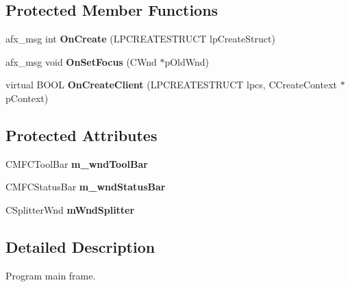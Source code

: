 \subsection*{Protected Member Functions}
\begin{DoxyCompactItemize}
\item 
\hypertarget{class_c_main_frame_a48666466fd37412fcaeff75c3b12e0ed}{afx\+\_\+msg int {\bfseries On\+Create} (L\+P\+C\+R\+E\+A\+T\+E\+S\+T\+R\+U\+C\+T lp\+Create\+Struct)}\label{class_c_main_frame_a48666466fd37412fcaeff75c3b12e0ed}

\item 
\hypertarget{class_c_main_frame_adc353a3d1fc497fbc009b6d9e6914a82}{afx\+\_\+msg void {\bfseries On\+Set\+Focus} (C\+Wnd $\ast$p\+Old\+Wnd)}\label{class_c_main_frame_adc353a3d1fc497fbc009b6d9e6914a82}

\item 
\hypertarget{class_c_main_frame_ac863d694fd3637d492ef97396defbd8e}{virtual B\+O\+O\+L {\bfseries On\+Create\+Client} (L\+P\+C\+R\+E\+A\+T\+E\+S\+T\+R\+U\+C\+T lpcs, C\+Create\+Context $\ast$p\+Context)}\label{class_c_main_frame_ac863d694fd3637d492ef97396defbd8e}

\end{DoxyCompactItemize}
\subsection*{Protected Attributes}
\begin{DoxyCompactItemize}
\item 
\hypertarget{class_c_main_frame_ac8558942627d1502b5095e736840a1f3}{C\+M\+F\+C\+Tool\+Bar {\bfseries m\+\_\+wnd\+Tool\+Bar}}\label{class_c_main_frame_ac8558942627d1502b5095e736840a1f3}

\item 
\hypertarget{class_c_main_frame_a5842bded00e9137fbbf77343b99863be}{C\+M\+F\+C\+Status\+Bar {\bfseries m\+\_\+wnd\+Status\+Bar}}\label{class_c_main_frame_a5842bded00e9137fbbf77343b99863be}

\item 
\hypertarget{class_c_main_frame_a1d68466db594c4bebf41f707bc0a0647}{C\+Splitter\+Wnd {\bfseries m\+Wnd\+Splitter}}\label{class_c_main_frame_a1d68466db594c4bebf41f707bc0a0647}

\end{DoxyCompactItemize}


\subsection{Detailed Description}
Program main frame. 


